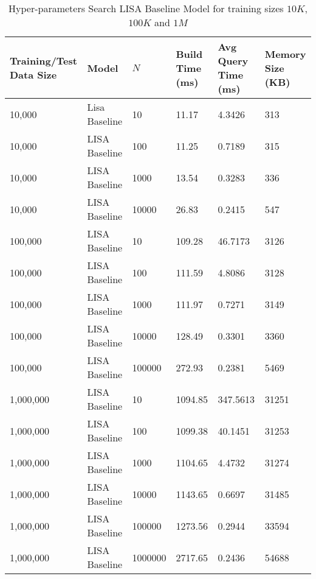 \begin{table}
	\centering
	\begin{tabular}{||p{}<{\centering}|p{}<{\centering}| p{}<{\centering}|p{}<{\centering}|p{}<{\centering}|p{}<{\centering}||}
		\hline
		Training/Test Data Size& Model & $N$ & Build Time (ms) & Avg Query Time (ms) & Memory Size (KB)\\ [0.5ex] 
		\hline
		\hline
		10,000& Lisa Baseline & 10 & 11.17 & 4.3426 & 313\\
		\hline
		10,000& LISA Baseline & 100 & 11.25 & 0.7189 & 315\\
		\hline
		10,000& LISA Baseline & 1000 & 13.54 & 0.3283 & 336\\
		\hline
		10,000& LISA Baseline & 10000 &26.83 & 0.2415 & 547\\
		\hline
		100,000& LISA Baseline & 10 & 109.28 & 46.7173 & 3126\\
		\hline
		100,000& LISA Baseline & 100 & 111.59& 4.8086 & 3128\\
		\hline
		100,000& LISA Baseline & 1000 & 111.97 & 0.7271 & 3149\\
		\hline
		100,000& LISA Baseline & 10000 & 128.49 & 0.3301 & 3360\\
		\hline
		100,000& LISA Baseline & 100000 & 272.93 & 0.2381 & 5469\\
		\hline
		1,000,000& LISA Baseline & 10 & 1094.85 & 347.5613 & 31251\\
		\hline
		1,000,000& LISA Baseline & 100 & 1099.38 & 40.1451 & 31253\\
		\hline
		1,000,000& LISA Baseline & 1000 & 1104.65 & 4.4732 & 31274\\
		\hline
		1,000,000& LISA Baseline & 10000 & 1143.65 & 0.6697 & 31485\\
		\hline
		1,000,000& LISA Baseline & 100000 & 1273.56 &  0.2944 &33594 \\
		\hline
		1,000,000& LISA Baseline & 1000000 & 2717.65 & 0.2436 & 54688\\
		\hline
		\hline
	\end{tabular}
    \caption{Hyper-parameters Search LISA Baseline Model for training sizes $10K$, $100K$ and $1M$ \\
    }
    \label{small_lognormal_lisa_baseline_10000}
\end{table}

